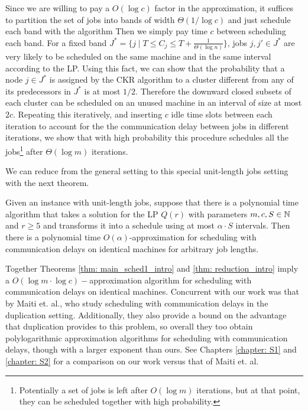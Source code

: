 Since we are willing to pay a $O(\log c)$ factor in the approximation, 
it suffices to partition the set of jobs into bands of width $\Theta(1/\log c)$ and just schedule each band with the algorithm
Then we simply pay time $c$ between scheduling each band.
For a fixed band $J^* = \{j \mid T \leq C_j \leq T + \frac{1}{\Theta( \log n)}\}$, jobs $j,j' \in J^*$ are very likely to be scheduled on the same machine and in the 
same interval according to the LP. Using this fact, we can show that 
 the probability that a node $j \in J^*$ is assigned by the CKR algorithm to a cluster different from any of its predecessors in $J^*$ is at most $1/2$.   
Therefore the downward closed subsets of each cluster can be scheduled on an unused machine in an interval of size at most $2c$.
Repeating this iteratively, and inserting $c$ idle time slots between each iteration to account for the the communication delay between jobs in different iterations,
we show that with high probability this procedure schedules all the jobs\footnote{Potentially a set of jobs is left after $O(\log m)$ iterations, 
but at that point, they can be scheduled together with high probability.} after $\Theta(\log m)$ iterations. 



We can reduce from the general setting to this special unit-length jobs setting with the next theorem.
\begin{theorem}\label{thm: reduction_intro}
  Given an instance with unit-length jobs, 
  suppose that there is a polynomial time algorithm that takes a solution for the LP $Q(r)$ with parameters $m,c,S \in \mathbb{N}$ and $r \geq 5$
  and transforms it into a schedule using at most $\alpha \cdot S$
  intervals. Then there is a polynomial time  $O(\alpha)$-approximation for scheduling with communication delays on identical machines for arbitrary job lengths.
\end{theorem}
Together Theorems \ref{thm: main_sched1_intro} and \ref{thm: reduction_intro} imply a $O(\log m \cdot \log c)-$approximation algorithm for scheduling with communication delays on identical machines.
Concurrent with our work was that by Maiti et. al., who study scheduling with communication delays in the duplication setting. 
Additionally, they also provide a bound on the advantage that duplication provides to this problem, so overall they too obtain polylogarithmic approximation algorithms for scheduling with communication delays, though with a larger exponent than ours.
See Chapters \ref{chapter: S1} and \ref{chapter: S2} for a comparison on our work versus that of Maiti et. al.

